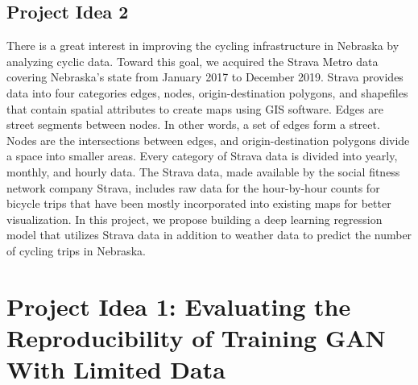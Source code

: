 \documentclass{report}
\begin{document}
\subsection{Project Idea 2}
There is a great interest in improving the cycling infrastructure in Nebraska by analyzing cyclic data. Toward this goal, we acquired the Strava Metro data covering Nebraska's state from January 2017 to December 2019.  Strava provides data into four categories edges, nodes, origin-destination polygons, and shapefiles that contain spatial attributes to create maps using GIS software. Edges are street segments between nodes. In other words, a set of edges form a street. Nodes are the intersections between edges, and origin-destination polygons divide a space into smaller areas. Every category of Strava data is divided into yearly, monthly, and hourly data. The Strava data, made available by the social fitness network company Strava, includes raw data for the hour-by-hour counts for bicycle trips that have been mostly incorporated into existing maps for better visualization. In this project, we propose building a deep learning regression model that utilizes Strava data in addition to weather data to predict the number of cycling trips in Nebraska. 

\section{Project Idea 1: Evaluating the Reproducibility of Training GAN With Limited Data}
\end{document}
